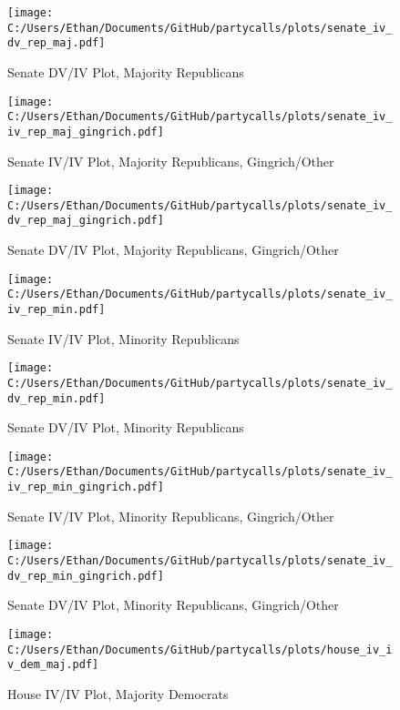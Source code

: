 \documentclass[12pt]{article}
\begin{document}
\begin{figure}[H]
	\centering
	\caption{Senate DV/IV Plot, Majority Republicans}
	\texttt{[image: C:/Users/Ethan/Documents/GitHub/partycalls/plots/senate\_iv\_dv\_rep\_maj.pdf]}
\end{figure}

\begin{figure}[H]
	\centering
	\caption{Senate IV/IV Plot, Majority Republicans, Gingrich/Other}
	\texttt{[image: C:/Users/Ethan/Documents/GitHub/partycalls/plots/senate\_iv\_iv\_rep\_maj\_gingrich.pdf]}
\end{figure}

\begin{figure}[H]
	\centering
	\caption{Senate DV/IV Plot, Majority Republicans, Gingrich/Other}
	\texttt{[image: C:/Users/Ethan/Documents/GitHub/partycalls/plots/senate\_iv\_dv\_rep\_maj\_gingrich.pdf]}
\end{figure}

\begin{figure}[H]
	\centering
	\caption{Senate IV/IV Plot, Minority Republicans}
	\texttt{[image: C:/Users/Ethan/Documents/GitHub/partycalls/plots/senate\_iv\_iv\_rep\_min.pdf]}
\end{figure}

\begin{figure}[H]
	\centering
	\caption{Senate DV/IV Plot, Minority Republicans}
	\texttt{[image: C:/Users/Ethan/Documents/GitHub/partycalls/plots/senate\_iv\_dv\_rep\_min.pdf]}
\end{figure}

\begin{figure}[H]
	\centering
	\caption{Senate IV/IV Plot, Minority Republicans, Gingrich/Other}
	\texttt{[image: C:/Users/Ethan/Documents/GitHub/partycalls/plots/senate\_iv\_iv\_rep\_min\_gingrich.pdf]}
\end{figure}

\begin{figure}[H]
	\centering
	\caption{Senate DV/IV Plot, Minority Republicans, Gingrich/Other}
	\texttt{[image: C:/Users/Ethan/Documents/GitHub/partycalls/plots/senate\_iv\_dv\_rep\_min\_gingrich.pdf]}
\end{figure}

\begin{figure}[H]
	\centering
	\caption{House IV/IV Plot, Majority Democrats}
	\texttt{[image: C:/Users/Ethan/Documents/GitHub/partycalls/plots/house\_iv\_iv\_dem\_maj.pdf]}
\end{figure}
\end{document}
